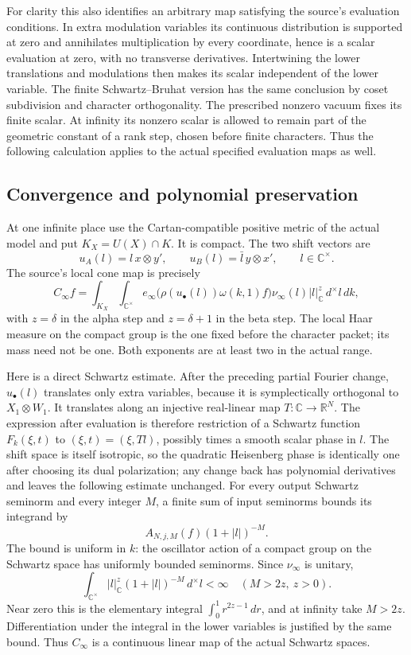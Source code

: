 For clarity this also identifies an arbitrary map
satisfying the source's evaluation conditions. In extra
modulation variables its continuous distribution is
supported at zero and annihilates multiplication by
every coordinate, hence is a scalar evaluation at zero,
with no transverse derivatives. Intertwining the lower
translations and modulations then makes its scalar
independent of the lower variable. The finite
Schwartz--Bruhat version has the same conclusion by
coset subdivision and character orthogonality.
The prescribed nonzero vacuum fixes its finite scalar.
At infinity its nonzero scalar is allowed to remain
part of the geometric constant of a rank step, chosen
before finite characters. Thus the following calculation
applies to the actual specified evaluation maps as well.

\subsection{Convergence and polynomial preservation}

At one infinite place use the Cartan-compatible positive
metric of the actual model and put \(K_X=U(X)\cap K\).
It is compact. The two shift vectors are
\[
       u_A(l)=l\,x\otimes y',\qquad
       u_B(l)=\bar l\,y\otimes x',
                         \qquad l\in\mathbb C^\times.
\]
The source's local cone map is precisely
\[
 C_\infty f=
    \int_{K_X}\int_{\mathbb C^\times}
       e_\infty\bigl(\rho(u_\bullet(l))\omega(k,1)f\bigr)
                \nu_\infty(l)|l|_{\mathbb C}^{z}
                                      \,d^\times l\,dk ,
\]
with \(z=\delta\) in the alpha step and \(z=\delta+1\)
in the beta step. The local Haar measure on the compact
group is the one fixed before the character packet;
its mass need not be one. Both exponents are at least
two in the actual range.

Here is a direct Schwartz estimate. After the preceding
partial Fourier change, \(u_\bullet(l)\) translates
only extra variables, because it is symplectically
orthogonal to \(X_1\otimes W_1\).
It translates along an injective real-linear map
\(T:\mathbb C\to\mathbb R^N\). The expression after
evaluation is therefore restriction of a Schwartz
function \(F_k(\xi,t)\) to
\((\xi,t)=(\xi,Tl)\), possibly times a smooth scalar
phase in \(l\). The shift space is itself isotropic,
so the quadratic Heisenberg phase is identically one
after choosing its dual polarization; any change back
has polynomial derivatives and leaves the following
estimate unchanged. For every output Schwartz seminorm
and every integer \(M\), a finite sum of input seminorms
bounds its integrand by
\[
       A_{N,j,M}(f)(1+|l|)^{-M}.
\]
The bound is uniform in \(k\): the oscillator action of
a compact group on the Schwartz space has uniformly
bounded seminorms. Since \(\nu_\infty\) is unitary,
\[
 \int_{\mathbb C^\times}|l|_{\mathbb C}^{z}
                         (1+|l|)^{-M}\,d^\times l<\infty
                                        \quad(M>2z,\ z>0).
\]
Near zero this is the elementary integral
\(\int_0^1 r^{2z-1}\,dr\), and at infinity take \(M>2z\).
Differentiation under the integral in the lower variables
is justified by the same bound. Thus \(C_\infty\) is a
continuous linear map of the actual Schwartz spaces.


